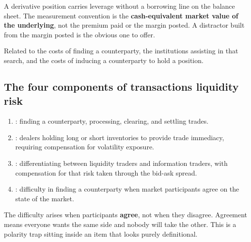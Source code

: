 \begin{lrtrapbox}
A derivative position carries leverage without a borrowing line on the balance sheet. The measurement convention is the \textbf{cash-equivalent market value of the underlying}, not the premium paid or the margin posted. A distractor built from the margin posted is the obvious one to offer.
\end{lrtrapbox}


\begin{lrdefbox}
Related to the costs of finding a counterparty, the institutions assisting in that search, and the costs of inducing a counterparty to hold a position.
\end{lrdefbox}

\subsection{The four components of transactions liquidity risk}

\begin{enumerate}[label=\alph*)]
\item {}: finding a counterparty, processing, clearing, and settling trades.
\item {}: dealers holding long or short inventories to provide trade immediacy, requiring compensation for volatility exposure.
\item {}: differentiating between liquidity traders and information traders, with compensation for that risk taken through the bid-ask spread.
\item {}: difficulty in finding a counterparty when market participants agree on the state of the market.
\end{enumerate}

\begin{lrtrapbox}
The difficulty arises when participants \textbf{agree}, not when they disagree. Agreement means everyone wants the same side and nobody will take the other. This is a polarity trap sitting inside an item that looks purely definitional.
\end{lrtrapbox}

